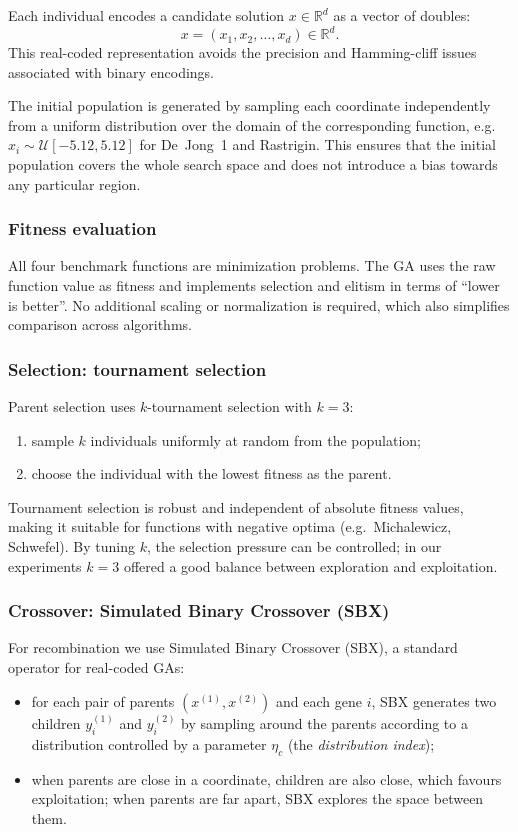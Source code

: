 \documentclass[a4paper,11pt]{article}
\begin{document}
Each individual encodes a candidate solution $x \in \mathbb{R}^d$ as a vector of
doubles:
\[
  x = (x_1, x_2, \dots, x_d) \in \mathbb{R}^d.
\]
This real-coded representation avoids the precision and Hamming-cliff issues
associated with binary encodings.

The initial population is generated by sampling each coordinate independently
from a uniform distribution over the domain of the corresponding function,
e.g.\ $x_i \sim \mathcal{U}[-5.12,5.12]$ for De~Jong~1 and Rastrigin.
This ensures that the initial population covers the whole search space and
does not introduce a bias towards any particular region.

\subsubsection{Fitness evaluation}

All four benchmark functions are minimization problems. The GA uses the raw
function value as fitness and implements selection and elitism in terms of
``lower is better''. No additional scaling or normalization is required, which
also simplifies comparison across algorithms.

\subsubsection{Selection: tournament selection}

Parent selection uses $k$-tournament selection with $k=3$:
\begin{enumerate}
  \item sample $k$ individuals uniformly at random from the population;
  \item choose the individual with the lowest fitness as the parent.
\end{enumerate}
Tournament selection is robust and independent of absolute fitness values,
making it suitable for functions with negative optima (e.g.\ Michalewicz,
Schwefel). By tuning $k$, the selection pressure can be controlled; in our
experiments $k=3$ offered a good balance between exploration and exploitation.

\subsubsection{Crossover: Simulated Binary Crossover (SBX)}

For recombination we use Simulated Binary Crossover (SBX), a standard operator
for real-coded GAs:
\begin{itemize}
  \item for each pair of parents $(x^{(1)}, x^{(2)})$ and each gene $i$, SBX
        generates two children $y^{(1)}_i$ and $y^{(2)}_i$ by sampling around
        the parents according to a distribution controlled by a parameter
        $\eta_c$ (the \emph{distribution index});
  \item when parents are close in a coordinate, children are also close, which
        favours exploitation; when parents are far apart, SBX explores the
        space between them.
\end{itemize}
\end{document}
